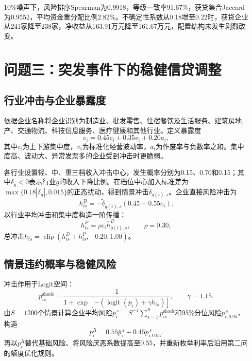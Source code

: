 \documentclass[UTF8,a4paper,12pt,fontset=fandol]{ctexart}
\newcommand{\logit}{\operatorname{logit}}
\numberwithin{equation}{section}
\begin{document}
10\%噪声下，风险排序Spearman为0.9918，等级一致率91.67\%，获贷集合Jaccard为0.9552，平均资金重分配比例2.82\%。不确定性系数从0.18增至0.22时，获贷企业从241家降至238家，净收益从163.91万元降至161.67万元，配置结构未发生剧烈改变。

\section{问题三：突发事件下的稳健信贷调整}

\subsection{行业冲击与企业暴露度}

依据企业名称将企业识别为制造业、批发零售、住宿餐饮及生活服务、建筑房地产、交通物流、科技信息服务、医疗健康和其他行业。定义暴露度
\begin{equation}
e_i=0.45c_i+0.35v_i+0.20a_i,
\end{equation}
其中$c_i$为上下游集中度，$v_i$为标准化经营波动率，$a_i$为作废率与负数率之和。集中度高、波动大、异常发票多的企业受到冲击时更脆弱。

各行业设置轻、中、重三档收入冲击中心，发生概率分别为0.15、0.70和0.15；其中$\delta_g<0$表示行业$g$的收入下降比例。在档位中心加入标准差为$\max\{0.18|\delta_g|,0.015\}$的正态扰动，得到情景冲击$\widetilde\delta_{g(i),s}$。企业直接风险冲击为
\begin{equation}
h_{is}^{D}=-\widetilde\delta_{g(i),s}(0.45+0.55e_i).
\end{equation}
以行业平均冲击和集中度构造一阶传播：
\begin{equation}
h_{is}^{P}=\rho c_i\bar h_{g(i),s}^{D},\qquad \rho=0.30,
\end{equation}
总冲击$h_{is}=\operatorname{clip}(h_{is}^{D}+h_{is}^{P},-0.20,1.00)$。

\subsection{情景违约概率与稳健风险}

冲击作用于Logit空间：
\begin{equation}
p_{is}^{\mathrm{shock}}=
\frac{1}{1+\exp[-(\logit(p_i)+\gamma h_{is})]},\qquad \gamma=1.15.
\end{equation}
由$S=1200$个情景计算企业平均风险$\bar p_i^{\,s}=S^{-1}\sum_{s=1}^{S}p_{is}^{\mathrm{shock}}$和95\%分位风险$p_{i,0.95}^{\,s}$，构造
\begin{equation}
p_i^R=0.55\bar p_i^{\,s}+0.45p_{i,0.95}^{\,s}.
\end{equation}
再以$p_i^R$替代基础风险、将风险厌恶系数提高至0.55，并重新枚举利率后沿用第二问的额度优化规则。
\end{document}

